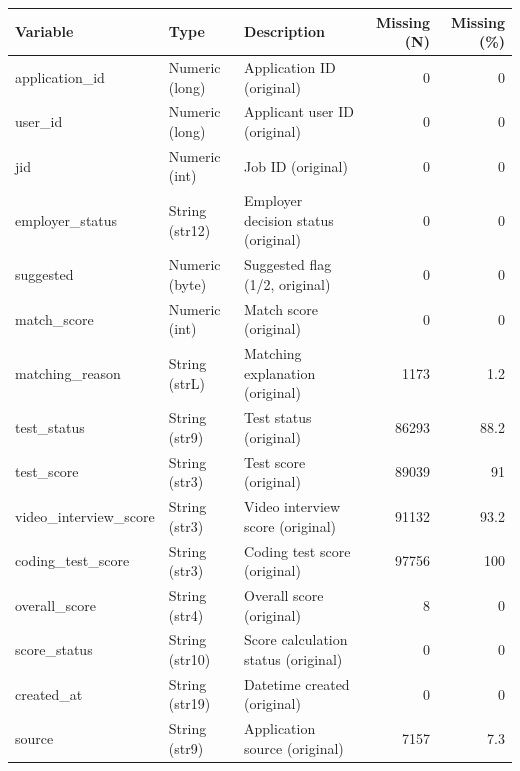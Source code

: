 \begin{threeparttable}


\begin{tabular}{@{}lllrr@{}}


\toprule


\textbf{Variable} & \textbf{Type} & \textbf{Description} & \textbf{Missing (N)} & \textbf{Missing (\%)} \\


\midrule


\midrule
application\_id & Numeric (long) & Application ID (original)&           0&           0\\
user\_id & Numeric (long) & Applicant user ID (original)&           0&           0\\
jid & Numeric (int) & Job ID (original)&           0&           0\\
employer\_status & String (str12) & Employer decision status (original)&           0&           0\\
suggested & Numeric (byte) & Suggested flag (1/2, original)&           0&           0\\
match\_score & Numeric (int) & Match score (original)&           0&           0\\
matching\_reason & String (strL) & Matching explanation (original)&        1173&         1.2\\
test\_status & String (str9) & Test status (original)&       86293&        88.2\\
test\_score & String (str3) & Test score (original)&       89039&          91\\
video\_interview\_score & String (str3) & Video interview score (original)&       91132&        93.2\\
coding\_test\_score & String (str3) & Coding test score (original)&       97756&         100\\
overall\_score & String (str4) & Overall score (original)&           8&           0\\
score\_status & String (str10) & Score calculation status (original)&           0&           0\\
created\_at & String (str19) & Datetime created (original)&           0&           0\\
source & String (str9) & Application source (original)&        7157&         7.3\\
\bottomrule


\end{tabular}


\end{threeparttable}

